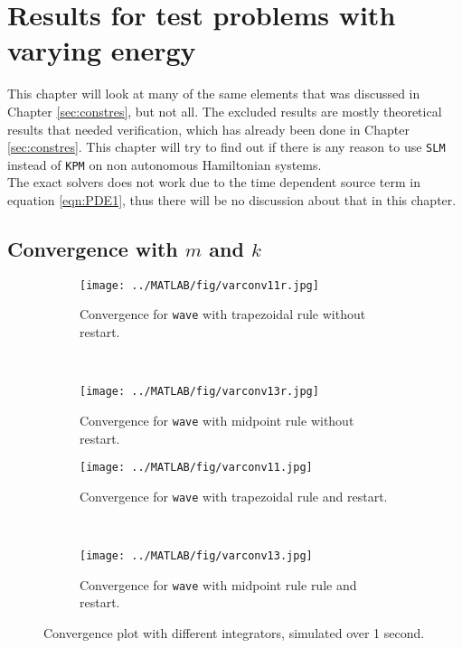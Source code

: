\chapter{Results for test problems with varying energy}%
\label{sec:varyener} %
This chapter will look at many of the same elements that was discussed in Chapter \ref{sec:constres}, but not all. The excluded results are mostly theoretical results that needed verification, which has already been done in Chapter \ref{sec:constres}. This chapter will try to find out if there is any reason to use \texttt{SLM} instead of \texttt{KPM} on non autonomous Hamiltonian systems. \\

\noindent The exact solvers does not work due to the time dependent source term in equation \eqref{eqn:PDE1}, thus there will be no discussion about that in this chapter.
\section{Convergence with $m$ and $k$} %
\label{sec:vconv}
\begin{figure}[H]
        \centering
		\begin{subfigure}[b]{0.3\textwidth}
                \texttt{[image: ../MATLAB/fig/varconv11r.jpg]}
                \caption{ Convergence for \texttt{wave} with trapezoidal rule without restart. }
                \label{fig:varconv11r}
        \end{subfigure}%
        ~
        \begin{subfigure}[b]{0.3\textwidth}
                \texttt{[image: ../MATLAB/fig/varconv13r.jpg]}
                \caption{ Convergence for \texttt{wave} with midpoint rule without restart. }
                \label{fig:varconv13r}
        \end{subfigure}
        \begin{subfigure}[b]{0.3\textwidth}
                \texttt{[image: ../MATLAB/fig/varconv11.jpg]}
                \caption{ Convergence for \texttt{wave} with trapezoidal rule and restart. }
                \label{fig:varconv11}
        \end{subfigure}%
        ~
        \begin{subfigure}[b]{0.3\textwidth}
                \texttt{[image: ../MATLAB/fig/varconv13.jpg]}
                \caption{ Convergence for \texttt{wave} with midpoint rule rule and restart. }
                \label{fig:varconv13}
        \end{subfigure}

        \caption{ Convergence plot with different integrators, simulated over 1 second. }
        \label{fig:varconv}
\end{figure}

